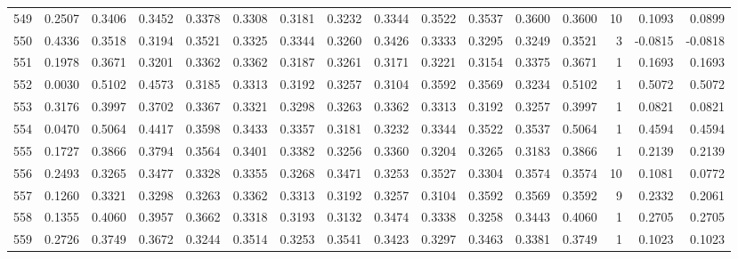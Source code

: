 \begin{tabular}{lrrrrrrrrrrrrrrr}
549 &      0.2507 &  0.3406 &  0.3452 &  0.3378 &  0.3308 &  0.3181 &  0.3232 &  0.3344 &  0.3522 &  0.3537 &   0.3600 &     0.3600 &     10 &                    0.1093 &                     0.0899 \\
550 &      0.4336 &  0.3518 &  0.3194 &  0.3521 &  0.3325 &  0.3344 &  0.3260 &  0.3426 &  0.3333 &  0.3295 &   0.3249 &     0.3521 &      3 &                   -0.0815 &                    -0.0818 \\
551 &      0.1978 &  0.3671 &  0.3201 &  0.3362 &  0.3362 &  0.3187 &  0.3261 &  0.3171 &  0.3221 &  0.3154 &   0.3375 &     0.3671 &      1 &                    0.1693 &                     0.1693 \\
552 &      0.0030 &  0.5102 &  0.4573 &  0.3185 &  0.3313 &  0.3192 &  0.3257 &  0.3104 &  0.3592 &  0.3569 &   0.3234 &     0.5102 &      1 &                    0.5072 &                     0.5072 \\
553 &      0.3176 &  0.3997 &  0.3702 &  0.3367 &  0.3321 &  0.3298 &  0.3263 &  0.3362 &  0.3313 &  0.3192 &   0.3257 &     0.3997 &      1 &                    0.0821 &                     0.0821 \\
554 &      0.0470 &  0.5064 &  0.4417 &  0.3598 &  0.3433 &  0.3357 &  0.3181 &  0.3232 &  0.3344 &  0.3522 &   0.3537 &     0.5064 &      1 &                    0.4594 &                     0.4594 \\
555 &      0.1727 &  0.3866 &  0.3794 &  0.3564 &  0.3401 &  0.3382 &  0.3256 &  0.3360 &  0.3204 &  0.3265 &   0.3183 &     0.3866 &      1 &                    0.2139 &                     0.2139 \\
556 &      0.2493 &  0.3265 &  0.3477 &  0.3328 &  0.3355 &  0.3268 &  0.3471 &  0.3253 &  0.3527 &  0.3304 &   0.3574 &     0.3574 &     10 &                    0.1081 &                     0.0772 \\
557 &      0.1260 &  0.3321 &  0.3298 &  0.3263 &  0.3362 &  0.3313 &  0.3192 &  0.3257 &  0.3104 &  0.3592 &   0.3569 &     0.3592 &      9 &                    0.2332 &                     0.2061 \\
558 &      0.1355 &  0.4060 &  0.3957 &  0.3662 &  0.3318 &  0.3193 &  0.3132 &  0.3474 &  0.3338 &  0.3258 &   0.3443 &     0.4060 &      1 &                    0.2705 &                     0.2705 \\
559 &      0.2726 &  0.3749 &  0.3672 &  0.3244 &  0.3514 &  0.3253 &  0.3541 &  0.3423 &  0.3297 &  0.3463 &   0.3381 &     0.3749 &      1 &                    0.1023 &                     0.1023 \\

\end{tabular}
